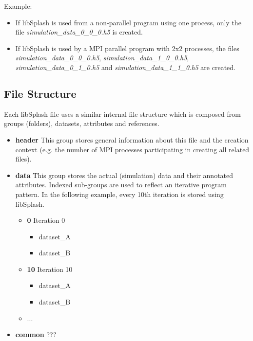 \documentclass[a4paper,10pt,BCOR12mm]{report}
\begin{document}
Example:
\begin{itemize}
	\item If libSplash is used from a non-parallel program using one process, only the file \emph{simulation\_data\_0\_0\_0.h5} is created.

	\item If libSplash is used by a MPI parallel program with 2x2 processes, the files
	\emph{simulation\_data\_0\_0\_0.h5}, \emph{simulation\_data\_1\_0\_0.h5},
	\emph{simulation\_data\_0\_1\_0.h5} and \emph{simulation\_data\_1\_1\_0.h5} are created.
\end{itemize}

\subsection{File Structure}

Each libSplash file uses a similar internal file structure which is composed from groups (folders),
datasets, attributes and references.

\begin{itemize}
	\item \textbf{header}
	This group stores general information about this file and the creation context (e.g.
	the number of MPI processes participating in creating all related files).

	\item \textbf{data}
	This group stores the actual (simulation) data and their annotated attributes. Indexed
	sub-groups are used to reflect an iterative program pattern. In the following example, every 10th
	iteration is stored using libSplash.
	\begin{itemize}
		\item \textbf{0}
		Iteration 0
		\begin{itemize}
			\item dataset\_A
			\item dataset\_B
		\end{itemize}

		\item \textbf{10}
		Iteration 10
		\begin{itemize}
			\item dataset\_A
			\item dataset\_B
		\end{itemize}

		\item ...
	\end{itemize}

	\item \textbf{common}
	???
\end{itemize}
\end{document}
